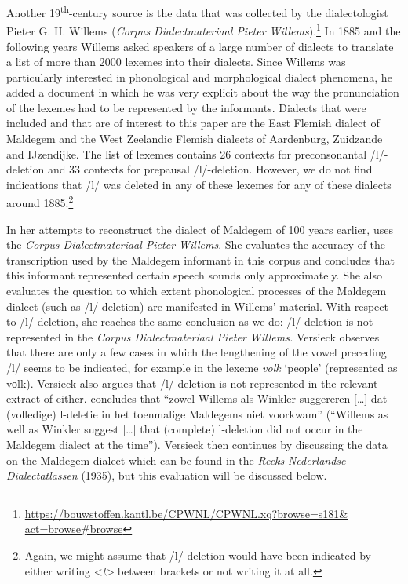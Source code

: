 \documentclass[output=paper,hidelinks,draftmode]{langscibook}
\begin{document}
Another 19\textsuperscript{th}-century source is the data that was collected by the dialectologist Pieter G. H. Willems (\textit{Corpus Dialectmateriaal Pieter Willems}).\footnote{ \href{https://bouwstoffen.kantl.be/CPWNL/CPWNL.xq?browse=s181 & act=browse\%23browse}{https://bouwstoffen.kantl.be/CPWNL/CPWNL.xq?browse=s181\& act=browse\#browse}} In 1885 and the following years Willems asked speakers of a large number of dialects to translate a list of more than 2000 lexemes into their dialects. Since Willems was particularly interested in phonological and morphological dialect phenomena, he added a document in which he was very explicit about the way the pronunciation of the lexemes had to be represented by the informants. Dialects that were included and that are of interest to this paper are the East Flemish dialect of Maldegem and the West Zeelandic Flemish dialects of Aardenburg, Zuidzande and IJzendijke. The list of lexemes contains 26 contexts for preconsonantal /l/-deletion and 33 contexts for prepausal /l/-deletion. However, we do not find indications that /l/ was deleted in any of these lexemes for any of these dialects around 1885.\footnote{ {Again, we might assume that /l/-deletion would have been indicated by either writing <}{\textit{l>} }{between brackets or not writing it at all.}}

In her attempts to reconstruct the dialect of Maldegem of 100 years earlier, \citet{Versieck1989} uses the \textit{Corpus Dialectmateriaal Pieter Willems}. She evaluates the accuracy of the transcription used by the Maldegem informant in this corpus and concludes that this informant represented certain speech sounds only approximately. She also evaluates the question to which extent phonological processes of the Maldegem dialect (such as /l/-deletion) are manifested in Willems’ material. With respect to /l/-deletion, she reaches the same conclusion as we do: /l/-deletion is not represented in the \textit{Corpus Dialectmateriaal Pieter Willems.} Versieck observes that there are only a few cases in which the lengthening of the vowel preceding /l/ seems to be indicated, for example in the lexeme \textit{volk} ‘people’ (represented as vo̅lk). Versieck also argues that /l/-deletion is not represented in the relevant extract of \citet{Winkler1874} either. \citet[175]{Versieck1989} concludes that “zowel Willems als Winkler suggereren […] dat (volledige) l-deletie in het toenmalige Maldegems niet voorkwam” (``Willems as well as Winkler suggest […] that (complete) l-deletion did not occur in the Maldegem dialect at the time''). Versieck then continues by discussing the data on the Maldegem dialect which can be found in the \textit{Reeks} \textit{Nederlandse Dialectatlassen} (1935), but this evaluation will be discussed below.
\end{document}
